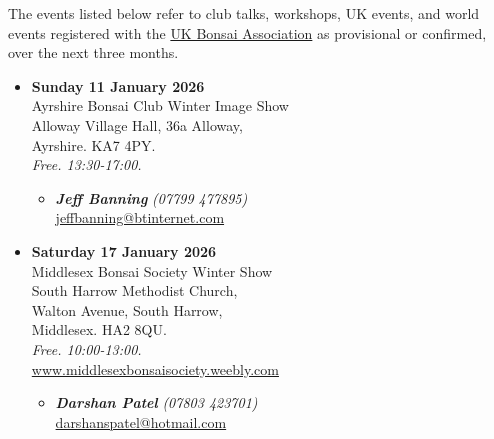 \label{2026-01-events}

The events listed below refer to club talks, workshops, UK events, and world events registered with the \href{https://www.ukbonsaiassoc.org/events.html}{UK Bonsai Association} as provisional or confirmed, over the next three months.
\begin{itemize}

    \item \textbf{Sunday 11 January 2026}
    \\
    Ayrshire Bonsai Club Winter Image Show \\
    Alloway Village Hall, 36a Alloway, \\
    Ayrshire. KA7 4PY.
    \\
    \emph{Free. 13:30-17:00.}
    \begin{itemize}
        \item \textbf{\emph{Jeff Banning}} \emph{(07799 477895)} \\
        \href{mailto:jeffbanning@btinternet.com}{jeffbanning@btinternet.com} 
    \end{itemize}

    \item \textbf{Saturday 17 January 2026}
    \\
    Middlesex Bonsai Society Winter Show \\
    South Harrow Methodist Church, \\
    Walton Avenue, South Harrow, \\
    Middlesex. HA2 8QU.
    \\
    \emph{Free. 10:00-13:00.}
    \\
    \href{https://www.middlesexbonsaisociety.weebly.com}{www.middlesexbonsaisociety.weebly.com}
    \begin{itemize}
        \item \textbf{\emph{Darshan Patel}} \emph{(07803 423701)} \\
        \href{mailto:darshanspatel@hotmail.com}{darshanspatel@hotmail.com} 
    \end{itemize}


\end{itemize}
